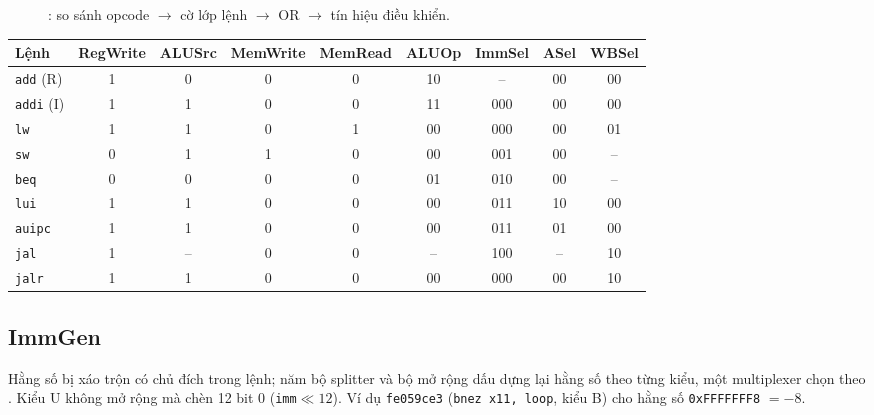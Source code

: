\documentclass[11pt,a4paper]{article}
\newcommand{\sig}[1]{\texttt{\detokenize{#1}}}
\begin{document}
\begin{figure}[htbp]
\centering
{}
\caption{\sig{MainControl}: so sánh opcode $\rightarrow$ cờ lớp lệnh $\rightarrow$ OR $\rightarrow$ tín hiệu điều khiển.}
\label{fig:ctl}
\end{figure}

\begin{center}
\small
\begin{tabular}{@{}lcccccccc@{}}
\toprule
\textbf{Lệnh} & RegWrite & ALUSrc & MemWrite & MemRead & ALUOp & ImmSel & ASel & WBSel\\
\midrule
\texttt{add} (R) & 1 & 0 & 0 & 0 & 10 & -- & 00 & 00\\
\texttt{addi} (I) & 1 & 1 & 0 & 0 & 11 & 000 & 00 & 00\\
\texttt{lw} & 1 & 1 & 0 & 1 & 00 & 000 & 00 & 01\\
\texttt{sw} & 0 & 1 & 1 & 0 & 00 & 001 & 00 & --\\
\texttt{beq} & 0 & 0 & 0 & 0 & 01 & 010 & 00 & --\\
\texttt{lui} & 1 & 1 & 0 & 0 & 00 & 011 & 10 & 00\\
\texttt{auipc} & 1 & 1 & 0 & 0 & 00 & 011 & 01 & 00\\
\texttt{jal} & 1 & -- & 0 & 0 & -- & 100 & -- & 10\\
\texttt{jalr} & 1 & 1 & 0 & 0 & 00 & 000 & 00 & 10\\
\bottomrule
\end{tabular}
\end{center}

\subsection{ImmGen}
Hằng số bị xáo trộn có chủ đích trong lệnh; năm bộ splitter và bộ mở rộng dấu dựng lại hằng số theo từng kiểu, một multiplexer chọn theo \sig{ImmSel}. Kiểu U không mở rộng mà chèn 12 bit 0 (\texttt{imm}$\ll12$).
Ví dụ \texttt{fe059ce3} (\texttt{bnez x11, loop}, kiểu B) cho hằng số \texttt{0xFFFFFFF8} $=-8$.
\end{document}
